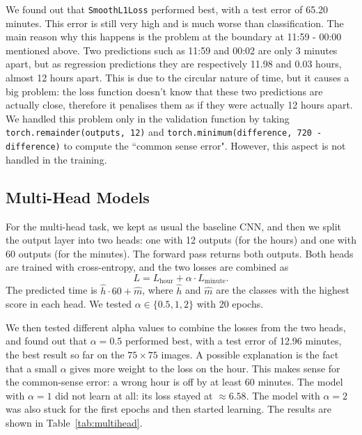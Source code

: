 \documentclass[a4paper]{article}
\begin{document}
We found out that \texttt{SmoothL1Loss} performed best, with a test error of 65.20 minutes. This error is still very high and is much worse than classification. The main reason why this happens is the problem at the boundary at 11:59 - 00:00 mentioned above. Two predictions such as 11:59 and 00:02 are only 3 minutes apart, but as regression predictions they are respectively 11.98 and 0.03 hours,
almost 12 hours apart. This is due to the circular nature of time, but it causes a big problem: the loss function doesn't know that these two predictions are actually close, therefore it penalises them as if they were actually 12 hours apart. We handled this problem only in the validation function by taking \texttt{torch.remainder(outputs, 12)} and \texttt{torch.minimum(difference, 720 - difference)} to compute the ``common sense error". However, this aspect is not handled in the training. 

\subsection{Multi-Head Models}



For the multi-head task, we kept as usual the baseline CNN, and then we split the output layer into two heads: one with 12 outputs (for the hours) and one with 60 outputs (for the minutes). The forward pass returns both outputs. Both heads are trained with cross-entropy, and the two losses are combined as
\[
L = L_{\text{hour}} + \alpha \cdot L_{\text{minute}}.
\]
The predicted time is \(\hat h\cdot60+\hat m\), where \(\hat h\) and \(\hat m\) are the classes with the highest score in each head. We tested \(\alpha \in \{0.5, 1, 2\}\) with 20 epochs.

We then tested different alpha values to combine the losses from the two heads, and found out that \(\alpha = 0.5\) performed best, with a test error of 12.96 minutes, the best result so far on the \(75\times75\) images. A possible explanation is the fact that a small \(\alpha\) gives more weight to the loss on the hour. This makes sense for the common-sense error: a wrong hour is off by at least 60 minutes. The model with \(\alpha=1\) did not learn at all: its loss stayed at \(\approx 6.58\). The model with \(\alpha = 2\) was also stuck for the first epochs and then started learning. The results are shown in Table~\ref{tab:multihead}.
\end{document}
